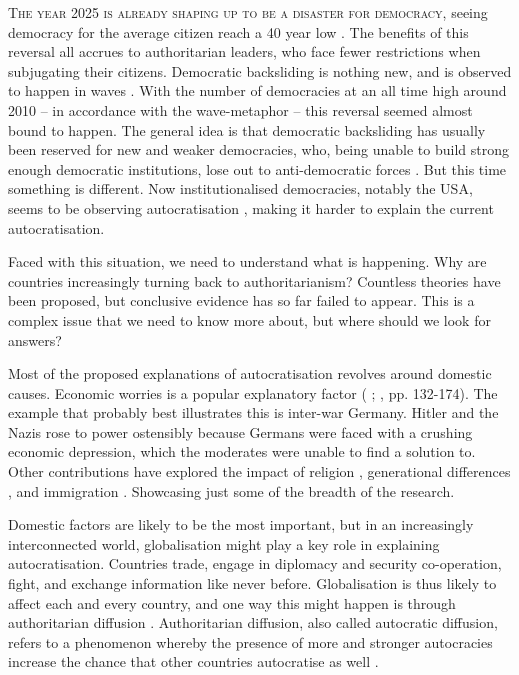 \lettrine{T}{he year 2025 is already shaping up to be a disaster for democracy}, seeing democracy for the average citizen reach a 40 year low \citep[p. 9]{nord_democracy_2025}. The benefits of this reversal all accrues to authoritarian leaders, who face fewer restrictions when subjugating their citizens. Democratic backsliding is nothing new, and is observed to happen in waves \citep{huntington_third_1991}. With the number of democracies at an all time high around 2010 \citep[pp. 10-11]{nord_democracy_2025} -- in accordance with the wave-metaphor -- this reversal seemed almost bound to happen. The general idea is that democratic backsliding has usually been reserved for new and weaker democracies, who, being unable to build strong enough democratic institutions, lose out to anti-democratic forces \citep{huntington_third_1991}. But this time something is different. Now institutionalised democracies, notably the USA, seems to be observing autocratisation \citep{nord_democracy_2025}, making it harder to explain the current autocratisation.

Faced with this situation, we need to understand what is happening. Why are countries increasingly turning back to authoritarianism? Countless theories have been proposed, but conclusive evidence has so far failed to appear. This is a complex issue that we need to know more about, but where should we look for answers? 

Most of the proposed explanations of autocratisation revolves around domestic causes. Economic worries is a popular explanatory factor (\citeauthor{lipset_chapter_1960} \citeyear{lipset_chapter_1960}; \citeauthor{norris_cultural_2019} \citeyear{norris_cultural_2019}, pp. 132-174). The example that probably best illustrates this is inter-war Germany. Hitler and the Nazis rose to power ostensibly because Germans were faced with a crushing economic depression, which the moderates were unable to find a solution to. Other contributions have explored the impact of religion \citep{huntington_third_1991}, generational differences \citep{norris_cultural_2019}, and immigration \citep[pp. 175-212]{norris_cultural_2019}. Showcasing just some of the breadth of the research. 

Domestic factors are likely to be the most important, but in an increasingly interconnected world, globalisation might play a key role in explaining autocratisation. Countries trade, engage in diplomacy and security co-operation, fight, and exchange information like never before. Globalisation is thus likely to affect each and every country, and one way this might happen is through authoritarian diffusion \citep{ambrosio_constructing_2010}. Authoritarian diffusion, also called autocratic diffusion, refers to a phenomenon whereby the presence of more and stronger autocracies increase the chance that other countries autocratise as well \citep{ambrosio_constructing_2010}. 

